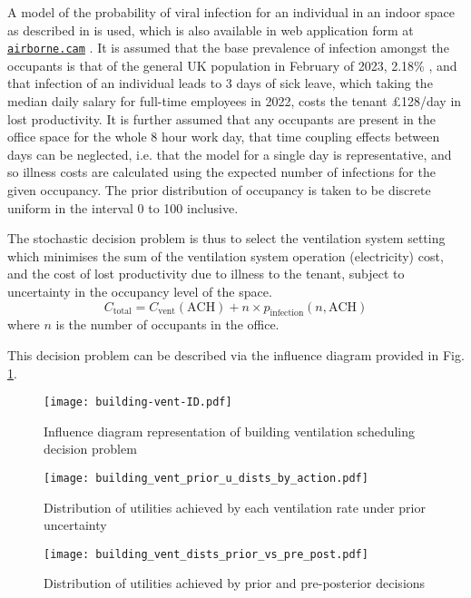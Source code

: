 A model of the probability of viral infection for an individual in an indoor space as described in \citep{deoliveira2021EvolutionSprayAerosol} is used, which is also available in web application form at \href{https://airborne.cam/}{\nolinkurl{airborne.cam}} \citep{gkantonas2021AirborneCamRisk}. It is assumed that the base prevalence of infection amongst the occupants is that of the general UK population in February of 2023, 2.18\% \citep{ons2023CoronavirusCOVID19Latest}, and that infection of an individual leads to 3 days of sick leave, which taking the median daily salary for full-time employees in 2022, costs the tenant £128/day \citep{ons2022EmployeeEarningsUK} in lost productivity.
It is further assumed that any occupants are present in the office space for the whole 8 hour work day, that time coupling effects between days can be neglected, i.e. that the model for a single day is representative, and so illness costs are calculated using the expected number of infections for the given occupancy. The prior distribution of occupancy is taken to be discrete uniform in the interval 0 to 100 inclusive.

The stochastic decision problem is thus to select the ventilation system setting which minimises the sum of the ventilation system operation (electricity) cost, and the cost of lost productivity due to illness to the tenant, subject to uncertainty in the occupancy level of the space.
\begin{equation}
    C_{\text{total}} = C_{\text{vent}}(\text{ACH}) + n \times p_{\text{infection}}(n,\text{ACH})
\end{equation}
where $n$ is the number of occupants in the office.

This decision problem can be described via the influence diagram provided in Fig. \ref{fig:ID-building-vent}.\\

\begin{figure}[p]
    \centering
    \texttt{[image: building-vent-ID.pdf]}
    \vspace{4pt}
    \caption{Influence diagram representation of building ventilation scheduling decision problem} \label{fig:ID-building-vent}
\end{figure}

\begin{figure}[p]
    \centering
    \begin{minipage}{.475\textwidth}
        \centering
        \texttt{[image: building\_vent\_prior\_u\_dists\_by\_action.pdf]}
        \caption{Distribution of utilities achieved by each ventilation rate under prior uncertainty}
        \label{fig:b_vent_a_dists}
    \end{minipage}%
    \hfill
    \begin{minipage}{.475\textwidth}
        \centering
        \texttt{[image: building\_vent\_dists\_prior\_vs\_pre\_post.pdf]}
        \caption{Distribution of utilities achieved by prior and pre-posterior decisions}
    \label{fig:b_vent_prior_vs_prepost}
    \end{minipage}%
\end{figure}

